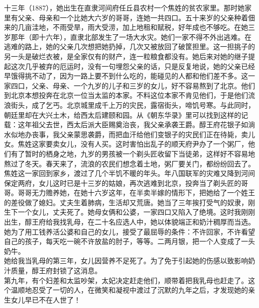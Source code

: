 十三年（1887），她出生在直隶河间府任丘县农村一个焦姓的贫农家里。那时她家里有父亲、母亲和一个比她大六岁的哥哥，连她一共四口。五十来岁的父亲种着佃来的几亩洼地，不雨受旱，雨大受涝，加上地租和赋税，好年成也不够吃。在她三岁那年（即十六年），直隶北部发生了一场大水灾。她们一家不得不外出逃难。在逃难的路上，她的父亲几次想把她扔掉，几次又被放回了破筐担里。这一担挑子的另一头是破烂衣被，是全家仅有的财产，连一粒粮食都没有。她后来对她的继子提起这次几乎被弃的厄运时，没有一句埋怨父亲的话，只是反复地说，她的父亲已经早饿得挑不动了，因为一路上要不到什么吃的，能碰见的人都和他们差不多。这一家四口，父亲、母亲、一个九岁的儿子和三岁的女儿，好不容易熬到了北京。他们到北京本想投奔在北京一位当太监的本家。不料这位本家不肯见他们，于是他们流浪街头，成了乞丐。北京城里成千上万的灾民，露宿街头，啼饥号寒。与此同时，朝廷里却在大兴土木，给西太后建颐和园。从《朝东华录》里可以找到这样的记载：这年祖父去世，西太后派大臣赐奠治丧，我父亲承袭王爵。醇王府花银子如淌水似地办丧事，我父亲蒙思袭爵，而把血汗给他们变银子的灾民们正在待毙，卖儿女。焦姓这家要卖女儿，没有人买。这时害怕出乱子的顺天府尹办了一个粥厂，他们有了暂时的栖身之地，九岁的男孩被一个剃头匠收留下当徒弟，这样好不容易地熬过了冬天。春天来了，流浪的农民们想念着土地，粥厂要关门，都纷纷回去了。焦姓这一家回到家乡，渡过了几个半饥不暖的年头。年八国联军的灾难又降到河间保定两府，女儿这时已是十三岁的姑娘，再次逃难到北京，投奔当了剃头匠的哥哥。哥哥无力赡养她，在她十六岁这年，在半卖半嫁的情形下，把她给了一个姓王的差役做了媳妇。丈夫生着肺病，生活却又荒唐。她当了三年挨打受气的奴隶，刚生下一个女儿，丈夫死了。她母女俩和公婆，一家四口又陷入了绝境。这时我刚刚出生，醇王府给我找乳母，在二十名应选人中，她以体貌端正和奶汁稠厚而当选。她为了用工钱养活公婆和自己的女儿，接受了最屈辱的条件：不许回家，不许看望自己的孩子，每天吃一碗不许放盐的肘子，等等。二两月银，把一个人变成了一头奶牛。\\

她给我当乳母的第三年，女儿因营养不足死了。为了免于引起她的伤感以致影响奶汁质量，醇王府封锁了这消息。\\

第九年，有个妇差和太监吵架，太妃决定赶走他们，顺带着把我乳母也赶走了。这个温顺地忍受了一切的人，在微笑和凝视中渡过了沉默的九年之后，才发现她的亲生女儿早已不在人世了！
